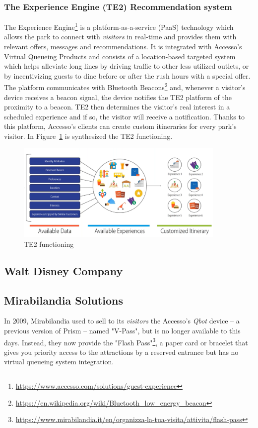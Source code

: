 \subsubsection{The Experience Engine (TE2) Recommendation system}
The Experience Engine\footnote{\url{https://www.accesso.com/solutions/guest-experience}} is a platform-as-a-service (PaaS) technology
which allows the park to connect with \textit{visitors} in real-time and provides them with relevant offers, messages and recommendations.
It is integrated with Accesso's Virtual Queueing Products and consists of a location-based targeted system~\cite{accesso-location-based-exp} which helps alleviate
long lines by driving traffic to other less utilized outlets, or by incentivizing guests to dine before or after the rush
hours with a special offer.
The platform communicates with Bluetooth Beacons\footnote{\url{https://en.wikipedia.org/wiki/Bluetooth_low_energy_beacon}} and,
whenever a visitor’s device receives a beacon signal, the device notifies the TE2 platform of the proximity to a beacon.
TE2 then determines the visitor's real interest in a scheduled experience and if so, the visitor will receive a notification.
Thanks to this platform, Accesso's clients can create custom itineraries for every park's visitor.
In Figure~\ref{fig:te2ex} is synthesized the TE2 functioning.

\begin{figure}[H]
    \centering
    \includegraphics[width=0.9\textwidth]{img/te2ex}
    \caption{TE2 functioning}
    \label{fig:te2ex}
\end{figure}

\subsection{Walt Disney Company}\label{subsec:walt-disney-company}

\subsection{Mirabilandia Solutions}\label{subsec:mirabilandia-solutions}
In 2009, Mirabilandia used to sell to its \textit{visitors} the Accesso's \textit{Qbot} device -- a previous version of Prism -- named "V-Pass"\cite{v-pass-mira}, but is no
longer available to this days.
Instead, they now provide the "Flash Pass"\footnote{\url{https://www.mirabilandia.it/en/organizza-la-tua-visita/attivita/flash-pass}},
a paper card or bracelet that gives you priority access to the attractions by a reserved entrance but has no virtual queueing system integration.


